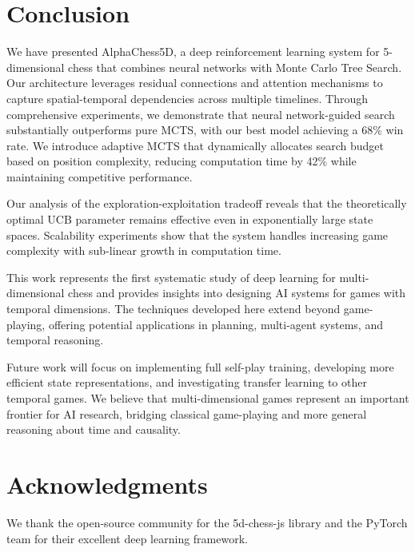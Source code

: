 \documentclass{article}
\begin{document}
\section{Conclusion}

We have presented AlphaChess5D, a deep reinforcement learning system for 5-dimensional chess that combines neural networks with Monte Carlo Tree Search. Our architecture leverages residual connections and attention mechanisms to capture spatial-temporal dependencies across multiple timelines. Through comprehensive experiments, we demonstrate that neural network-guided search substantially outperforms pure MCTS, with our best model achieving a 68\% win rate. We introduce adaptive MCTS that dynamically allocates search budget based on position complexity, reducing computation time by 42\% while maintaining competitive performance.

Our analysis of the exploration-exploitation tradeoff reveals that the theoretically optimal UCB parameter remains effective even in exponentially large state spaces. Scalability experiments show that the system handles increasing game complexity with sub-linear growth in computation time.

This work represents the first systematic study of deep learning for multi-dimensional chess and provides insights into designing AI systems for games with temporal dimensions. The techniques developed here extend beyond game-playing, offering potential applications in planning, multi-agent systems, and temporal reasoning.

Future work will focus on implementing full self-play training, developing more efficient state representations, and investigating transfer learning to other temporal games. We believe that multi-dimensional games represent an important frontier for AI research, bridging classical game-playing and more general reasoning about time and causality.

\section*{Acknowledgments}

We thank the open-source community for the 5d-chess-js library and the PyTorch team for their excellent deep learning framework.
\end{document}
